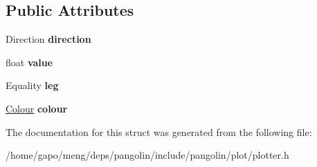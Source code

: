 \subsection*{Public Attributes}
\begin{DoxyCompactItemize}
\item 
Direction {\bfseries direction}\hypertarget{structpangolin_1_1_marker_a8e4515b4b344503e36cb09ed85f40fd8}{}\label{structpangolin_1_1_marker_a8e4515b4b344503e36cb09ed85f40fd8}

\item 
float {\bfseries value}\hypertarget{structpangolin_1_1_marker_a7e205b2755f77558cf2f672c8b55b708}{}\label{structpangolin_1_1_marker_a7e205b2755f77558cf2f672c8b55b708}

\item 
Equality {\bfseries leg}\hypertarget{structpangolin_1_1_marker_af5f198d565165ef282febe79995923ba}{}\label{structpangolin_1_1_marker_af5f198d565165ef282febe79995923ba}

\item 
\hyperlink{structpangolin_1_1_colour}{Colour} {\bfseries colour}\hypertarget{structpangolin_1_1_marker_a94c61df14eaa7a2ed0ae248169b5a7ce}{}\label{structpangolin_1_1_marker_a94c61df14eaa7a2ed0ae248169b5a7ce}

\end{DoxyCompactItemize}


The documentation for this struct was generated from the following file\+:\begin{DoxyCompactItemize}
\item 
/home/gapo/meng/deps/pangolin/include/pangolin/plot/plotter.\+h\end{DoxyCompactItemize}
